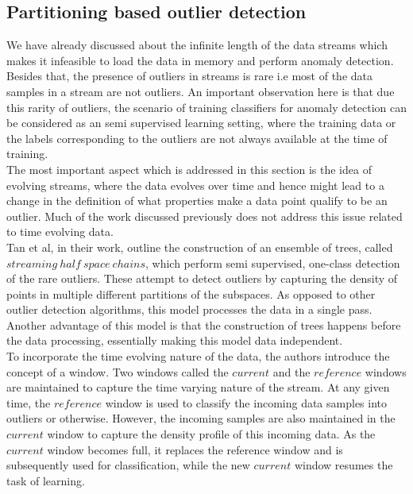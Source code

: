 \subsection{Partitioning based outlier detection}

We have already discussed about the infinite length of the data streams which makes it infeasible to load the data in memory and perform anomaly detection. Besides that, the presence of outliers in streams is rare i.e most of the data samples in a stream are not outliers. An important observation here is that due this rarity of outliers, the scenario of training classifiers for anomaly detection can be considered as an semi supervised learning setting, where the training data or the labels corresponding to the outliers are not always available at the time of training. \\

The most important aspect which is addressed in this section is the idea of evolving streams, where the data evolves over time and hence might lead to a change in the definition of what properties make a data point qualify to be an outlier. Much of the work discussed previously does not address this issue related to time evolving data. \\

Tan et al, in their work\cite{tan2011fast}, outline the construction of an ensemble of trees, called $streaming\ half\ space\ chains$, which perform semi supervised, one-class detection of the rare outliers. These attempt to detect outliers by capturing the density of points in multiple different partitions of the subspaces. As opposed to other outlier detection algorithms, this model processes the data in a single pass. Another advantage of this model is that the construction of trees happens before the data processing, essentially making this model data independent. \\

To incorporate the time evolving nature of the data, the authors introduce the concept of a window. Two windows called the $current$ and the $reference$ windows are maintained to capture the time varying nature of the stream. At any given time, the $reference$ window is used to classify the incoming data samples into outliers or otherwise. However, the incoming samples are also maintained in the $current$ window to capture the density profile of this incoming data. As the $current$ window becomes full, it replaces the reference window and is subsequently used for classification, while the new $current$ window resumes the task of learning. \\

